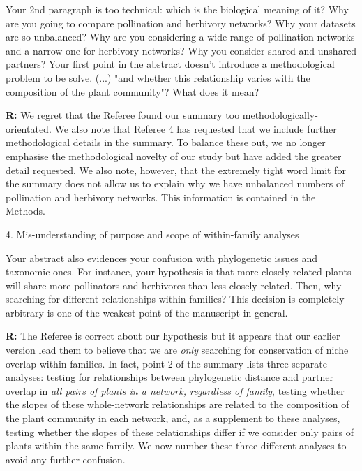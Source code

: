 \documentclass[12pt]{letter}
\newenvironment{refquote}{\bigskip \begin{it}}{\end{it}\smallskip}
\begin{document}
		\begin{refquote}
			Your 2nd paragraph is too technical: which is the biological meaning of it? Why are you going to compare pollination and herbivory networks? Why your datasets are so unbalanced? Why are you considering a wide range of pollination networks and a narrow one for herbivory networks? Why you consider shared and unshared partners? Your first point in the abstract doesn't introduce a methodological problem to be solve. (...) "and whether this relationship varies with the composition of the plant community"? What does it mean?
		\end{refquote}

		\textbf{R:} We regret that the Referee found our summary too methodologically-orientated. We also note that Referee 4 has requested that we include further methodological details in the summary. To balance these out, we no longer emphasise the methodological novelty of our study but have added the greater detail requested. We also note, however, that the extremely tight word limit for the summary does not allow us to explain why we have unbalanced numbers of pollination and herbivory networks. This information is contained in the Methods. 


	4. Mis-understanding of purpose and scope of within-family analyses 

		\begin{refquote}
		Your abstract also evidences your confusion with phylogenetic issues and taxonomic ones. For instance, your hypothesis is that more closely related plants will share more pollinators and herbivores than less closely related. Then, why searching for different relationships within families? This decision is completely arbitrary is one of the weakest point of the manuscript in general.
		\end{refquote}


		\textbf{R:} The Referee is correct about our hypothesis but it appears that our earlier version lead them to believe that we are \emph{only} searching for conservation of niche overlap within families. In fact, point 2 of the summary lists three separate analyses: testing for relationships between phylogenetic distance and partner overlap in \emph{all pairs of plants in a network, regardless of family}, testing whether the slopes of these whole-network relationships are related to the composition of the plant community in each network, and, as a supplement to these analyses, testing whether the slopes of these relationships differ if we consider only pairs of plants within the same family. We now number these three different analyses to avoid any further confusion. 
\end{document}
